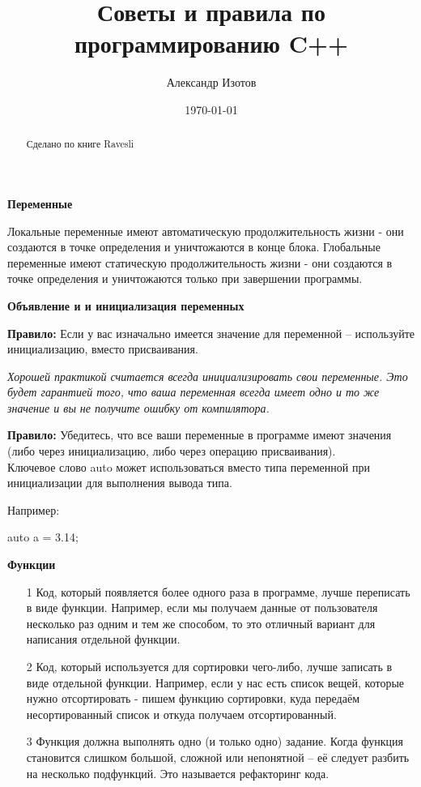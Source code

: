 \documentclass[a4paper,16pt]{report} %
\title{Советы и правила по программированию C++}
\date{\today} %
\author{Александр Изотов}
\begin{document}
	\maketitle %

\begin{abstract} %
Сделано по книге Ravesli
\end{abstract}
\begin{center} 
	\large\textbf{Переменные}
\end{center}

Локальные переменные имеют автоматическую продолжительность жизни - они создаются в точке определения и уничтожаются в конце блока.
Глобальные переменные имеют статическую продолжительность жизни - они создаются в точке определения и уничтожаются только при завершении программы.

\begin{center} %
	\large\textbf{Объявление и и инициализация переменных}
\end{center}

\textbf{Правило:} Если у вас изначально имеется значение для переменной – используйте инициализацию, вместо присваивания.

\textit{Хорошей практикой считается всегда инициализировать свои переменные. Это будет гарантией того, что ваша переменная всегда имеет одно и то же значение и вы не получите ошибку от компилятора.}

\textbf{Правило:} Убедитесь, что все ваши переменные в программе имеют значения (либо через инициализацию, либо через операцию присваивания).
\\

Ключевое слово auto может использоваться вместо типа переменной при инициализации для выполнения вывода типа. 

Например:

auto a = 3.14;

\begin{center} 
	\large\textbf{Функции}
\end{center}

\begin{itemize} %
	\item[1] Код, который появляется более одного раза в программе, лучше переписать в виде функции. Например, если мы получаем данные от пользователя несколько раз одним и тем же способом, то это отличный вариант для написания отдельной функции.
	\item[2] Код, который используется для сортировки чего-либо, лучше записать в виде отдельной функции. Например, если у нас есть список вещей, которые нужно отсортировать - пишем функцию сортировки, куда передаём несортированный список и откуда получаем отсортированный.
	\item[3] Функция должна выполнять одно (и только одно) задание.
	Когда функция становится слишком большой, сложной или непонятной – её следует разбить на несколько подфункций. Это называется рефакторинг кода.
\end{itemize}
\end{document}
